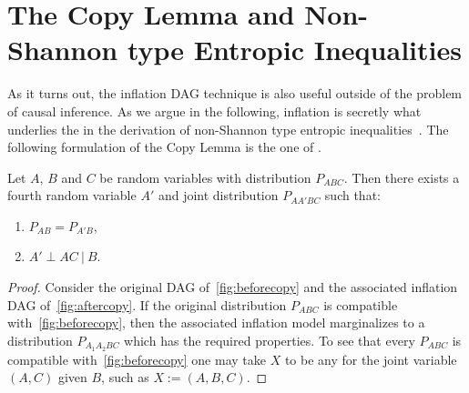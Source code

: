 \section{The Copy Lemma and Non-Shannon type Entropic Inequalities}\label{sec:NonShannon}

As it turns out, the inflation DAG technique is also useful outside of the problem of causal inference. As we argue in the following, inflation is secretly what underlies the  in the derivation of non-Shannon type entropic inequalities~\cite[Chapter~15]{yeung_network_2008}. The following formulation of the Copy Lemma is the one of \citet{kaced_equivalence_2013}.

\begin{lemma}
	Let $A$, $B$ and $C$ be random variables with distribution $P_{ABC}$. Then there exists a fourth random variable $A'$ and joint distribution $P_{AA'BC}$ such that:
	\begin{enumerate}
		\item $P_{AB} = P_{A'B}$,
		\item $A' \perp AC \:|\: B$.
	\label{copylemma}
	\end{enumerate}
\end{lemma}



\begin{proof}
	Consider the original DAG of~\cref{fig:beforecopy} and the associated inflation DAG of~\cref{fig:aftercopy}. If the original distribution $P_{ABC}$ is compatible with~\cref{fig:beforecopy}, then the associated inflation model marginalizes to a distribution $P_{A_1 A_2 B C}$ which has the required properties. To see that every $P_{ABC}$ is compatible with~\cref{fig:beforecopy} one may take $X$ to be any  for the joint variable $(A,C)$ given $B$, such as $X := (A,B,C)$.
\end{proof}

